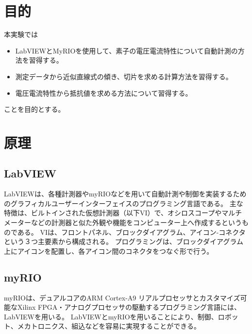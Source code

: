 \documentclass[11pt,dvipdfmx]{jarticle}
\begin{document}
\begin{jikkenTitle}
	\subTitle{} %
	\kyoudouII{} %
	\yoteibiII{}%
	\yoteibiIII{}%
\end{jikkenTitle}

\section{目的}
本実験では
\begin{itemize}
	\item LabVIEWとMyRIOを使用して、素子の電圧電流特性について自動計測の方法を習得する。
	\item 測定データから近似直線式の傾き、切片を求める計算方法を習得する。
	\item 電圧電流特性から抵抗値を求める方法について習得する。
\end{itemize}
ことを目的とする。

\section{原理}
\subsection{LabVIEW}
LabVIEWは、各種計測器やmyRIOなどを用いて自動計測や制御を実装するためのグラフィカルユーザーインターフェイスのプログラミング言語である。
主な特徴は、ビルトインされた仮想計測器（以下VI）で、オシロスコープやマルチメーターなどの計測器と似た外観や機能をコンピューター上へ作成するというものである。
VIは、フロントパネル、ブロックダイアグラム、アイコン-コネクタという３つ主要素から構成される。
プログラミングは、ブロックダイアグラム上にアイコンを配置し、各アイコン間のコネクタをつなぐ形で行う。

\subsection{myRIO}
myRIOは、デュアルコアのARM Cortex-A9 リアルプロセッサとカスタマイズ可能なXilinx FPGA・アナログプロセッサの駆動するプログラミング言語には、LabVIEWを用いる。
LabVIEWとmyRIOを用いることにより、制御、ロボット、メカトロニクス、組込などを容易に実現することができる。
\end{document}
